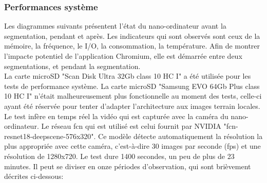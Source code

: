 \subsubsection{Performances système}
\noindent Les diagrammes suivants présentent l'état du nano-ordinateur avant la segmentation, pendant et après. Les indicateurs qui sont observés sont ceux de la mémoire, la fréquence, le I/O, la consommation, la température. Afin de montrer l'impacte potentiel de l'application Chromium, elle est démarrée entre deux segmentations, et pendant la segmentation. 
\vspace{0.5\baselineskip}
\\
\noindent La carte microSD "Scan Disk Ultra 32Gb class 10 HC I" a été utilisée pour les tests de performance système. La carte microSD "Samsung EVO 64Gb Plus class 10 HC I" n'était malheureusement plus fonctionnelle au moment des tests, celle-ci ayant été réservée pour tenter d'adapter l'architecture aux images terrain locales. 
\vspace{0.5\baselineskip}
\\
\noindent Le test infère en temps réel la vidéo qui est capturée avec la caméra du nano-ordinateur. Le réseau \acrshort{fcn} qui est utilisé est celui fournit par NVIDIA "fcn-resnet18-deepscene-576x320". Ce modèle détecte automatiquement la résolution la plus appropriée avec cette caméra, c'est-à-dire 30 images par seconde (\acrshort{fps}) et une résolution de 1280x720. Le test dure 1400 secondes, un peu de plus de 23 minutes. Il peut se diviser en onze périodes d'observation, qui sont brièvement décrites ci-dessous: 
